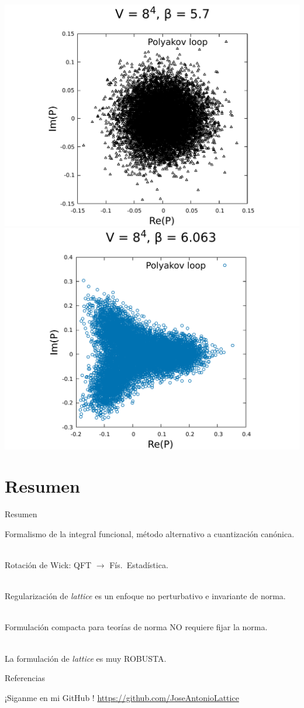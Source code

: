 \documentclass[11pt]{beamer}
\begin{document}
\begin{frame}
\begin{center}
\includegraphics[scale=0.25]{figures/polyakov_loop_beta=5_7.pdf}
\includegraphics[scale=0.25]{figures/polyakov_loop.pdf}
\end{center}
\end{frame}

\section{Resumen}
\begin{frame}{Resumen}

Formalismo de la integral funcional, método alternativo a cuantización canónica. \\~

Rotación de Wick: QFT $\to$ Fís.\ Estadística.  \\~

Regularización de \emph{lattice} es un enfoque no perturbativo e invariante de norma. \\~

Formulación compacta para teorías de norma NO requiere fijar la norma. \\~

La formulación de \emph{lattice} es muy ROBUSTA.
    
\end{frame}

\begin{frame}{Referencias}

¡Siganme en mi GitHub \faGithub !
\url{https://github.com/JoseAntonioLattice}
\end{frame}
\end{document}
